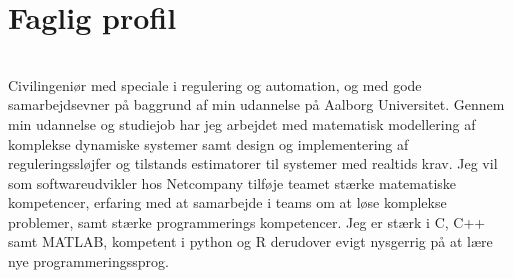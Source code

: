 \documentclass[a4paper]{twentysecondcv} %
\begin{document}

\aboutme{}




\skillstext{}


\makeprofile %


\section{Faglig profil}\\[0.2cm]
Civilingeniør med speciale i regulering og automation, og med gode samarbejdsevner på baggrund af min udannelse på Aalborg Universitet. Gennem min udannelse og studiejob har jeg arbejdet med matematisk modellering af komplekse dynamiske systemer samt design og implementering af reguleringssløjfer og tilstands estimatorer til systemer med realtids krav. Jeg vil som softwareudvikler hos Netcompany tilføje teamet stærke matematiske kompetencer, erfaring med at samarbejde i teams om at løse komplekse problemer, samt stærke programmerings kompetencer. Jeg er stærk i C, C++ samt MATLAB, kompetent i python og R derudover evigt nysgerrig på at lære nye programmeringssprog.
\end{document}
